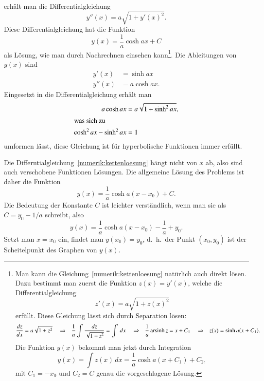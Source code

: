 \begin{loesung}
erhält man die Differentialgleichung
\begin{equation}
y''(x)=a\sqrt{1+y'(x)^2}.
\label{numerik:kettenloesung}
\end{equation}
Diese Differentialgleichung hat die Funktion
\[
y(x) = \frac1a \cosh ax + C
\]
%
als Lösung, wie man durch Nachrechnen einsehen kann\footnote{
Man kann die Gleichung~\eqref{numerik:kettenloesung} natürlich auch direkt
lösen. Dazu bestimmt man zuerst die Funktion $z(x)=y'(x)$, welche die
Differentialgleichung
\[
z'(x)=a\sqrt{1+z(x)^2}
\]
erfüllt.
Diese Gleichung lässt sich durch Separation lösen:
%
\[
\begin{aligned}
\frac{dz}{dx}&=a\sqrt{1+z^2}
&&\Rightarrow&
\frac1a \int\frac{dz}{\sqrt{1+z^2}}&=\int \,dx
&&\Rightarrow&
\frac1a \operatorname{arsinh} z &=x+C_1
&&\Rightarrow&
z(x)=\sinh a(x+C_1).
\end{aligned}
\]
%
Die Funktion $y(x)$ bekommt man jetzt durch Integration
\[
y(x)=\int z(x)\,dx = \frac1a \cosh a(x+C_1) + C_2,
\]
mit $C_1 = -x_0$ und $C_2=C$ genau die vorgeschlagene Lösung.
}.
Die Ableitungen von $y(x)$ sind
\begin{align*}
y' (x) &=  \sinh ax\\
y''(x) &= a\cosh ax.
\end{align*}
Eingesetzt in die Differentialgleichung erhält man
\begin{align*}
a\cosh ax&=a\sqrt{1+\sinh^2 ax},
\\
\intertext{was sich zu}
\cosh^2ax-\sinh^2ax&=1
\end{align*}
umformen lässt, diese Gleichung ist für hyperbolische Funktionen
immer erfüllt.
%
%

Die Differntialgleichung~\eqref{numerik:kettenloesung}
hängt nicht von $x$ ab,
also sind auch verschobene Funktionen Lösungen.
Die allgemeine Lösung des Problems ist daher die Funktion
\begin{equation}
y(x)=\frac1a\cosh a(x-x_0) + C.
\label{numerik:ketteaC}
\end{equation}
Die Bedeutung der Konstante $C$ ist leichter verständlich, wenn man sie
als $C=y_0-1/a$ schreibt, also
\[
y(x)=\frac1a\cosh a(x-x_0) -\frac1a+y_0.
\]
Setzt man $x=x_0$ ein, findet man $y(x_0)=y_0$, d.~h.~der Punkt $(x_0,y_0)$
ist der Scheitelpunkt des Graphen von $y(x)$.


\end{loesung}
